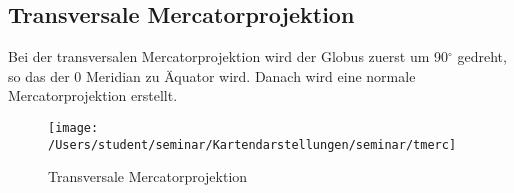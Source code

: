 \subsection{Transversale Mercatorprojektion}
\label{sec:transmercator}
Bei der transversalen  Mercatorprojektion wird der Globus zuerst um 90$ ^\circ $ gedreht, so das der 0 Meridian zu Äquator wird. Danach wird eine normale Mercatorprojektion erstellt.\\

\begin{figure}[hbtp]
\centering
\texttt{[image: /Users/student/seminar/Kartendarstellungen/seminar/tmerc]} 
\caption{Transversale Mercatorprojektion}
\end{figure}
\newpage 